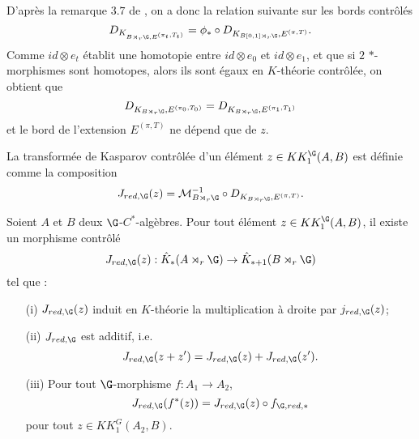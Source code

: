D'après la remarque $3.7$ de \cite{OY2}, on a donc la relation suivante sur les bords contrôlés
\[D_{K_{B\rtimes_r\G,E^{(\pi_t,T_t)}}} = \phi_* \circ D_{K_{B[0,1]\rtimes_r\G},E^{(\pi,T)}}.\]
Comme $id \otimes e_t$ établit une homotopie entre $id\otimes e_0$ et $id\otimes e_1$, et que si $2$ $*$-morphismes sont homotopes, alors ils sont égaux en $K$-théorie contrôlée, on obtient que 
\[D_{K_{B\rtimes_r \G}, E^{(\pi_0,T_0)}}=D_{K_{B\rtimes_r \G}, E^{(\pi_1,T_1)}}\]
et le bord de l'extension $E^{(\pi,T)}$ ne dépend que de $z$.\\

\begin{definition}
La transformée de Kasparov contrôlée d'un élément $z\in KK_1^\G(A,B)$ est définie comme la composition
\[J_{red,\G}(z)=\mathcal M_{B\rtimes_r \G}^{-1}\circ D_{K_{B\rtimes_r \G}, E^{(\pi,T)}}.\]
\end{definition}

\begin{prop}
Soient $A$ et $B$ deux $\G$-$C^*$-algèbres. Pour tout élément $z\in KK^\G_1(A,B)$, il existe un morphisme contrôlé
\[J_{red,\G}(z) : \hat K_*(A\rtimes_r \G)\rightarrow \hat K_{*+1}(B\rtimes_r \G)\]
tel que :
\begin{enumerate}
\item[(i)] $J_{red,\G}(z)$ induit en $K$-théorie la multiplication à droite par $j_{red,\G}(z)$;
\item[(ii)] $J_{red,\G}$ est additif, i.e.
\[J_{red,\G}(z+z')=J_{red,\G}(z)+J_{red,\G}(z').\]
\item[(iii)] Pour tout $\G$-morphisme $f : A_1\rightarrow A_2$,
\[J_{red,\G}(f^*(z))=J_{red,\G}(z)\circ f_{\G,red,*}\] pour tout $z\in KK_1^G(A_2,B)$.
\end{enumerate}
\end{prop}

